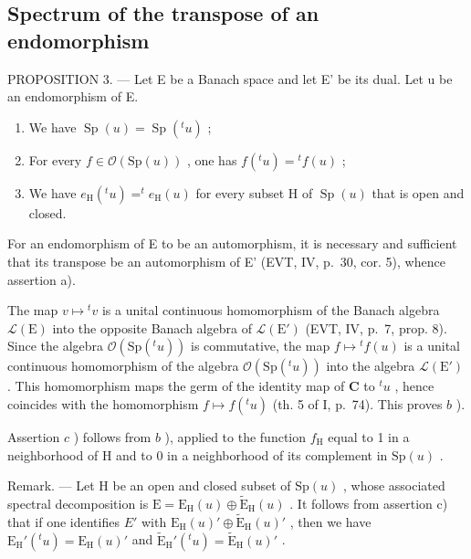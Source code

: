 \subsection{Spectrum of the transpose of an endomorphism}

PROPOSITION 3. --- Let E be a Banach space and let E' be its dual. Let u be an endomorphism of E.

\begin{enumerate}
\def\labelenumi{\alph{enumi})}
\item
  We have \(\operatorname{Sp}(u) = \operatorname{Sp}(^t u)\) ;
\item
  For every \(f \in \mathcal{O}(\mathrm{Sp}(u))\) , one has \(f(^t u) = {}^t f(u)\) ;
\item
  We have \(e_{\mathrm{H}}(^{t}u)=^{t}e_{\mathrm{H}}(u)\) for every subset H of \(\operatorname{Sp}(u)\) that is open and closed.
\end{enumerate}

For an endomorphism of E to be an automorphism, it is necessary and sufficient that its transpose be an automorphism of E' (EVT, IV, p.~30, cor. 5), whence assertion a).

The map \(v \mapsto {}^t v\) is a unital continuous homomorphism of the Banach algebra \(\mathcal{L}(\mathrm{E})\) into the opposite Banach algebra of \(\mathcal{L}(\mathrm{E}')\) (EVT, IV, p.~7, prop. 8). Since the algebra \(\mathcal{O}(\mathrm{Sp}({}^t u))\) is commutative, the map \(f \mapsto {}^t f(u)\) is a unital continuous homomorphism of the algebra \(\mathcal{O}(\mathrm{Sp}({}^t u))\) into the algebra \(\mathcal{L}(\mathrm{E}')\) . This homomorphism maps the germ of the identity map of \(\mathbf{C}\) to \({}^t u\) , hence coincides with the homomorphism \(f \mapsto f({}^t u)\) (th. 5 of I, p.~74). This proves \(b\) ).

Assertion \(c\) ) follows from \(b\) ), applied to the function \(f_{\mathrm{H}}\) equal to 1 in a neighborhood of H and to 0 in a neighborhood of its complement in \(\mathrm{Sp}(u)\) .

Remark. --- Let H be an open and closed subset of \(\mathrm{Sp}(u)\) , whose associated spectral decomposition is \(\mathrm{E} = \mathrm{E}_{\mathrm{H}}(u) \oplus \widetilde{\mathrm{E}}_{\mathrm{H}}(u)\) . It follows from assertion c) that if one identifies \(E'\) with \(\mathrm{E}_{\mathrm{H}}(u)' \oplus \widetilde{\mathrm{E}}_{\mathrm{H}}(u)'\) , then we have \(\mathrm{E}_{\mathrm{H}}'(^{t}u) = \mathrm{E}_{\mathrm{H}}(u)'\) and \(\widetilde{\mathrm{E}}_{\mathrm{H}}'(^{t}u) = \widetilde{\mathrm{E}}_{\mathrm{H}}(u)'\) .

